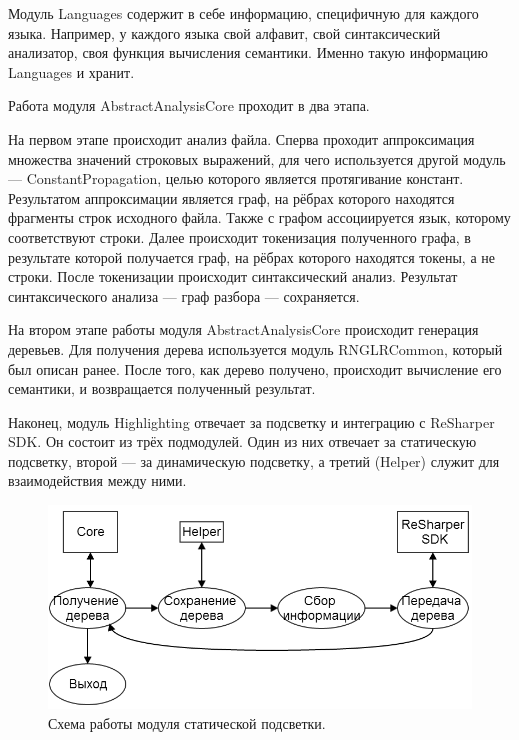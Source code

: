 Модуль Languages содержит в себе информацию, специфичную для каждого языка. Например, у каждого языка свой алфавит, свой синтаксический анализатор, своя функция вычисления семантики. Именно такую информацию Languages и хранит. 

Работа модуля AbstractAnalysisCore проходит в два этапа. 

На первом этапе происходит анализ файла. Сперва проходит аппроксимация множества значений строковых выражений, для чего используется другой модуль --- ConstantPropagation, целью которого является протягивание констант. Результатом аппроксимации является граф, на рёбрах которого находятся фрагменты строк исходного файла. Также с графом ассоциируется язык, которому соответствуют строки. Далее происходит токенизация полученного графа, в результате которой получается граф, на рёбрах которого находятся токены, а не строки. После токенизации происходит синтаксический анализ. Результат синтаксического анализа --- граф разбора --- сохраняется. 

На втором этапе работы модуля AbstractAnalysisCore происходит генерация деревьев. Для получения дерева используется модуль RNGLRCommon, который был описан ранее. После того, как дерево получено, происходит вычисление его семантики, и возвращается полученный результат. 

Наконец, модуль Highlighting отвечает за подсветку и интеграцию с ReSharper SDK. Он состоит из трёх подмодулей. Один из них отвечает за статическую подсветку, второй --- за динамическую подсветку, а третий (Helper) служит для взаимодействия между ними. 

\begin{figure}[t]
\centering
\includegraphics[width=\linewidth]{Ivanov/Pictures/staticHighlighting.png}
\caption{Схема работы модуля статической подсветки.}
\label{staticHighlighting}
\end{figure}

